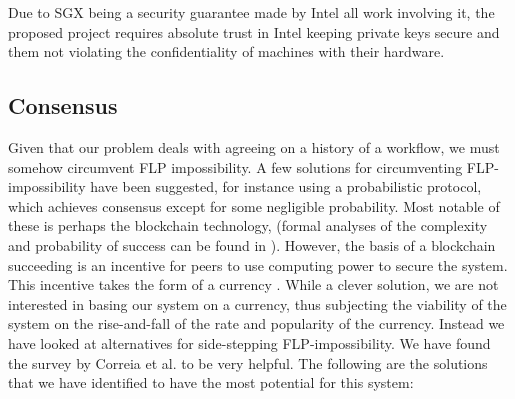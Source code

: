 \documentclass[12pt]{article}
\begin{document}
		Due to SGX being a security guarantee made by Intel all work involving it, the proposed project requires absolute trust in Intel keeping private keys secure and them not violating the confidentiality of machines with their hardware.

		\subsection{Consensus}
		Given that our problem deals with agreeing on a history of a workflow, we must somehow circumvent FLP impossibility.
		A few solutions for circumventing FLP-impossibility have been suggested, for instance using a probabilistic protocol, which achieves consensus except for some negligible probability. Most notable of these is perhaps the blockchain technology, (formal analyses of the complexity and probability of success can be found in \cite{miller2014anonymous}). However, the basis of a blockchain succeeding is an incentive for peers to use computing power to secure the system. This incentive takes the form of a currency \cite{bitcoin-white-paper}. While a clever solution, we are not interested in basing our system on a currency, thus subjecting the viability of the system on the rise-and-fall of the rate and popularity of the currency. Instead we have looked at alternatives for side-stepping FLP-impossibility. We have found the survey by Correia et al. \cite{consensus-survey} to be very helpful. The following are the solutions that we have identified to have the most potential for this system:
\end{document}
